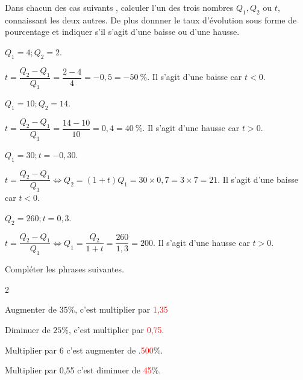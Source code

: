 \documentclass[11pt,a4paper]{article}  %
\begin{document}
Dans chacun des cas suivants , calculer l'un des trois nombres $Q_{1}, Q_{2}$ ou $t$, connaissant les deux autres. De plus donnner le taux d'évolution sous forme de pourcentage et indiquer s'il s'agit d'une baisse ou d'une hausse.
		\begin{enumMet}
		\item {} $Q_{1}=4 ; Q_{2}=2$.
		\begin{corrBox}
			$t=\dfrac{Q_2-Q_1}{Q_1}=\dfrac{2-4}{4}=-0,5=-50\ \%$. Il s'agit d'une baisse car $t<0$.
		\end{corrBox}
		\item $Q_{1}=10 ; Q_{2}=14$.
		\begin{corrBox}
			$t=\dfrac{Q_2-Q_1}{Q_1}=\dfrac{14-10}{10}=0,4=40\ \%$. Il s'agit d'une hausse car $t>0$.
		\end{corrBox}
		\item $Q_{1}=30 ; t=-0,30$.
		\begin{corrBox}
			$t=\dfrac{Q_2-Q_1}{Q_1} \iff Q_2=(1+t)Q_1=30\times 0,7=3\times 7=21$. Il s'agit d'une baisse car $t<0$.
		\end{corrBox}
		\item $Q_{2}=260 ; t=0,3$.
		\begin{corrBox}
			$t=\dfrac{Q_2-Q_1}{Q_1} \iff Q_1=\dfrac{Q_2}{1+t}=\dfrac{260}{1,3}=200$. Il s'agit d'une hausse car $t>0$.
		\end{corrBox}
	\end{enumMet}


Compléter les phrases suivantes.
\begin{multicols}{2}
	\begin{enumMet}
	\item Augmenter de $35 \%$, c'est multiplier par  \textcolor{red}{1,35}
	\item Diminuer de $25 \%$, c'est multiplier par \textcolor{red}{0,75}.
	\item Multiplier par 6 c'est augmenter de .\textcolor{red}{500}\%.
	\item Multiplier par 0,55 c'est diminuer de  \textcolor{red}{45}\%.	
\end{enumMet}
\end{multicols}
\end{document}
